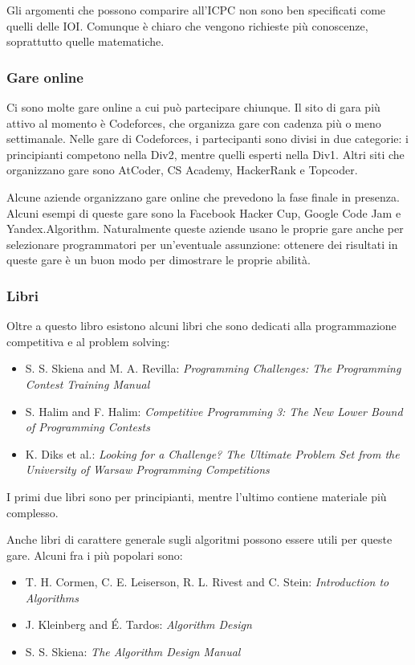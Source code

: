 Gli argomenti che possono comparire all'ICPC non sono
ben specificati come quelli delle IOI.
Comunque è chiaro che vengono richieste più conoscenze,
soprattutto quelle matematiche.

\subsubsection{Gare online}

Ci sono molte gare online a cui può partecipare chiunque.
Il sito di gara più attivo al momento è Codeforces,
che organizza gare con cadenza più o meno settimanale. 
Nelle gare di Codeforces, i partecipanti sono divisi in due categorie:
i principianti competono nella Div2, mentre quelli esperti nella Div1.
Altri siti che organizzano gare sono AtCoder, CS Academy, HackerRank e Topcoder.

Alcune aziende organizzano gare online che prevedono la fase finale in presenza.
Alcuni esempi di queste gare sono la Facebook Hacker Cup,
Google Code Jam e Yandex.Algorithm.
Naturalmente queste aziende usano le proprie gare anche per selezionare
programmatori per un'eventuale assunzione:
ottenere dei risultati in queste gare è un buon modo
per dimostrare le proprie abilità.

\subsubsection{Libri}

Oltre a questo libro esistono alcuni libri che
sono dedicati alla programmazione competitiva e al problem solving:

\begin{itemize}
\item S. S. Skiena and M. A. Revilla:
\emph{Programming Challenges: The Programming Contest Training Manual} \cite{ski03}
\item S. Halim and F. Halim:
\emph{Competitive Programming 3: The New Lower Bound of Programming Contests} \cite{hal13}
\item K. Diks et al.: \emph{Looking for a Challenge? The Ultimate Problem Set from
the University of Warsaw Programming Competitions} \cite{dik12}
\end{itemize}

I primi due libri sono per principianti,
mentre l'ultimo contiene materiale più complesso.

Anche libri di carattere generale sugli algoritmi possono
essere utili per queste gare. Alcuni fra i più popolari sono:

\begin{itemize}
\item T. H. Cormen, C. E. Leiserson, R. L. Rivest and C. Stein:
\emph{Introduction to Algorithms} \cite{cor09}
\item J. Kleinberg and É. Tardos:
\emph{Algorithm Design} \cite{kle05}
\item S. S. Skiena:
\emph{The Algorithm Design Manual} \cite{ski08}
\end{itemize}
